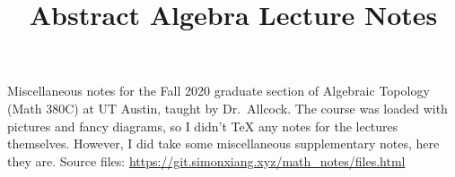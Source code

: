\documentclass{scrartcl}
\title{Abstract Algebra Lecture Notes}
\date{}
\begin{document}
\maketitle
Miscellaneous notes for the Fall 2020 graduate section of Algebraic Topology (Math 380C) at UT Austin, taught by Dr.\ Allcock. The course was loaded with pictures and fancy diagrams, so I didn't \TeX{} any notes for the lectures themselves. However, I did take some miscellaneous supplementary notes, here they are. Source files: \url{https://git.simonxiang.xyz/math_notes/files.html}
\tableofcontents
    
\end{document}
